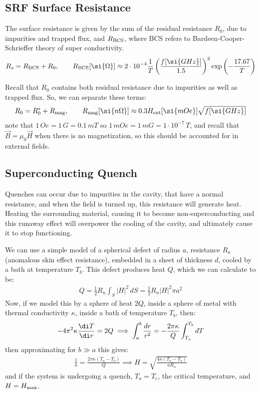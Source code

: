 \documentclass{article}
\numberwithin{equation}{section}
\begin{document}
\subsection{SRF Surface Resistance}
The surface resistance is given by the sum of the residual resistance $R_0$, due to impurities and trapped flux, and $R_{\rm BCS}$, where BCS refers to Bardeen-Cooper-Schrieffer theory of super conductivity. 
\begin{align}
R_s = R_{\rm BCS} + R_0 ,\qquad
R_{\rm BCS}[\si{\Omega}] \approx 2 \cdot 10^{-4} \frac{1}{T} \left( \frac{f[\si{GHz}]}{1.5} \right)^2 \exp \left( - \frac{17.67}{T}\right)
\end{align}

Recall that $R_0$ contains both residual resistance due to impurities as well as trapped flux. So, we can separate these terms:
\begin{align}
R_0 = R_0^* + R_{\rm mag} ,\qquad
 R_{\rm mag}[\si{n\Omega}] \approx 0.3 H_{\rm ext}[\si{mOe}] \sqrt{f [\si{GHz}]}
\end{align}
note that $1 \, \si{Oe} =1 \, \si{G} = 0.1 \, \si{mT}$ so $1 \, \si{mOe} = 1 \, \si{mG} = 1 \cdot 10^{-7} \, \si{T}$, and recall that $\vec{B} = \mu_0 \vec{H}$ when there is no magnetization, so this should be accounted for in external fields.

\subsection{Superconducting Quench }
Quenches can occur due to impurities in the cavity, that have a normal resistance, and when the field is turned up, this resistance will generate heat. Heating the surrounding material, causing it to become non-superconducting and this runaway effect will overpower the cooling of the cavity, and ultimately cause it to stop functioning.

We can use a simple model of a spherical defect of radius $a$, resistance $R_n$ (anomalous skin effect resistance), embedded in a sheet of thickness $d$, cooled by a bath at temperature $T_b$. This defect produces heat $Q$, which we can calculate to be:
\begin{align}
Q = \frac{1}{2} R_n \int_S |H|^2 \, dS = \frac{1}{2} R_n |H|^2 \pi a^2
\end{align}
Now, if we model this by a sphere of heat $2Q$, inside a sphere of metal with thermal conductivity $\kappa$, inside a bath of temperature $T_b$, then:
\begin{align}
- 4\pi ^2 \kappa \frac{\di T}{\di r} = 2Q \implies
 \int_a^b \frac{dr}{r^2} = - \frac{2\pi \kappa}{Q} \int_{T_a}^{T_b} dT
\end{align}
then approximating for $b \gg a$ this gives:
\begin{align}
\frac{1}{a} = \frac{2 \pi \kappa (T_a - T_b)}{Q} \implies 
H = \sqrt{\frac{4 \kappa(T_a-T_b)}{a R_n}}
\end{align}
and if the system is undergoing a quench, $T_a = T_c$, the critical temperature, and $H = H_{\rm max}$.
\end{document}
